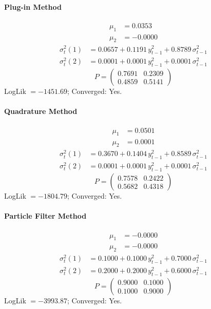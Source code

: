 \documentclass[11pt, a4paper]{article}
\begin{document}
\paragraph{Plug-in Method}
\begin{align}
\mu_{1} &= 0.0353 \\
\mu_{2} &= -0.0000
\end{align}
\begin{align}
\sigma^2_{t}(1) &= 0.0657 + 0.1191\, y_{t-1}^2 + 0.8789\, \sigma^2_{t-1} \\
\sigma^2_{t}(2) &= 0.0001 + 0.0001\, y_{t-1}^2 + 0.0001\, \sigma^2_{t-1}
\end{align}
\begin{equation}
P = \begin{pmatrix} 0.7691 & 0.2309 \\ 0.4859 & 0.5141 \end{pmatrix}
\end{equation}
LogLik $= -1451.69$; Converged: Yes.

\paragraph{Quadrature Method}
\begin{align}
\mu_{1} &= 0.0501 \\
\mu_{2} &= 0.0001
\end{align}
\begin{align}
\sigma^2_{t}(1) &= 0.3670 + 0.1404\, y_{t-1}^2 + 0.8589\, \sigma^2_{t-1} \\
\sigma^2_{t}(2) &= 0.0001 + 0.0001\, y_{t-1}^2 + 0.0001\, \sigma^2_{t-1}
\end{align}
\begin{equation}
P = \begin{pmatrix} 0.7578 & 0.2422 \\ 0.5682 & 0.4318 \end{pmatrix}
\end{equation}
LogLik $= -1804.79$; Converged: Yes.

\paragraph{Particle Filter Method}
\begin{align}
\mu_{1} &= -0.0000 \\
\mu_{2} &= -0.0000
\end{align}
\begin{align}
\sigma^2_{t}(1) &= 0.1000 + 0.1000\, y_{t-1}^2 + 0.7000\, \sigma^2_{t-1} \\
\sigma^2_{t}(2) &= 0.2000 + 0.2000\, y_{t-1}^2 + 0.6000\, \sigma^2_{t-1}
\end{align}
\begin{equation}
P = \begin{pmatrix} 0.9000 & 0.1000 \\ 0.1000 & 0.9000 \end{pmatrix}
\end{equation}
LogLik $= -3993.87$; Converged: Yes.
\end{document}
